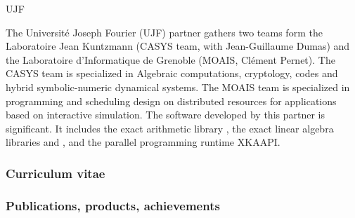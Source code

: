 \begin{sitedescription}{UJF}



The Université Joseph Fourier (UJF) partner gathers two teams form the Laboratoire Jean Kuntzmann
(CASYS team, with Jean-Guillaume Dumas) and the Laboratoire d’Informatique de
Grenoble (MOAIS, Clément Pernet). The 
CASYS team is specialized in Algebraic computations, cryptology, codes and hybrid symbolic-numeric dynamical systems. The MOAIS team is specialized in programming and scheduling
design on distributed resources for applications based on interactive simulation. The software
developed by this partner is significant. It includes the exact arithmetic
library \Givaro, the exact linear algebra libraries \fflas and \Linbox, and the
parallel programming runtime XKAAPI.

\subsubsection*{Curriculum vitae}





%

\subsubsection*{Publications, products, achievements}


\end{sitedescription}
